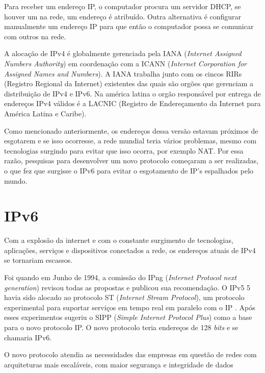 Para receber um endereço IP, o computador procura um servidor DHCP, se houver um na rede, um endereço é atribuído. Outra alternativa é configurar manualmente um endereço IP para que então o computador possa se comunicar com outros na rede.

A alocação de IPv4 é globalmente gerenciada pela IANA (\textit{Internet Assigned Numbers Authority}) em coordenação com a ICANN (\textit{Internet Corporation for Assigned Names and Numbers}). A IANA trabalha junto com os cincos RIRs (Registro Regional da Internet) existentes das quais são orgões que gerenciam a distribuição de IPv4 e IPv6. Na américa latina o orgão responsável por entrega de endereços IPv4 válidos é a LACNIC (Registro de Endereçamento da Internet para América Latina e Caribe).

Como mencionado anteriormente, os endereços dessa versão estavam próximos de esgotarem e se isso ocorresse, a rede mundial teria vários problemas, mesmo com tecnologias surgindo para evitar que isso ocorra, por exemplo NAT. Por essa razão, pesquisas para desenvolver um novo protocolo começaram a ser realizadas, o que fez que surgisse o IPv6 para evitar o esgotamento de IP's espalhados pelo mundo.



\section{IPv6}\label{sec:protIPv6}

Com a explosão da internet e com o constante surgimento de tecnologias, aplicações, serviços e dispositivos conectados a rede, os endereços atuais de IPv4 se tornariam escassos.

Foi quando em Junho de 1994, a comissão do IPng (\textit{Internet Protocol next generation}) revisou todas as propostas e publicou sua recomendação. O IPv5 5 havia sido alocado ao protocolo ST (\textit{Internet Stream Protocol}), um protocolo experimental para suportar serviços em tempo real em paralelo com o IP \cite{pucrs-ipv6}. Após esses experimentos sugeriu o SIPP (\textit{Simple Internet Protocol Plus}) como a base para o novo protocolo IP. O novo protocolo teria endereços de 128 \textit{bits} e se chamaria IPv6.

O novo protocolo atendia as necessidades das empresas em questão de redes com arquiteturas mais escaláveis, com maior segurança e integridade de dados
